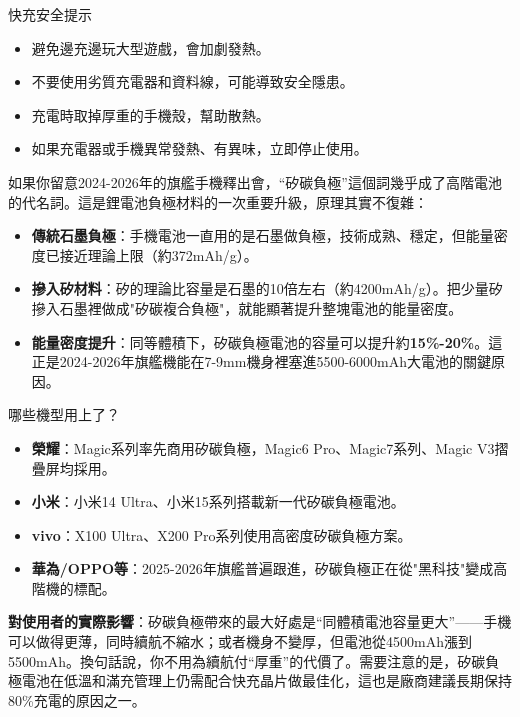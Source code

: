 \begin{tcbwarn}{快充安全提示}
\begin{itemize}
  \item 避免邊充邊玩大型遊戲，會加劇發熱。
  \item 不要使用劣質充電器和資料線，可能導致安全隱患。
  \item 充電時取掉厚重的手機殼，幫助散熱。
  \item 如果充電器或手機異常發熱、有異味，立即停止使用。
\end{itemize}

\end{tcbwarn}


如果你留意2024-2026年的旗艦手機釋出會，“矽碳負極”這個詞幾乎成了高階電池的代名詞。這是鋰電池負極材料的一次重要升級，原理其實不復雜：

\begin{itemize}
  \item \textbf{傳統石墨負極}：手機電池一直用的是石墨做負極，技術成熟、穩定，但能量密度已接近理論上限（約372mAh/g）。
  \item \textbf{摻入矽材料}：矽的理論比容量是石墨的10倍左右（約4200mAh/g）。把少量矽摻入石墨裡做成"矽碳複合負極"，就能顯著提升整塊電池的能量密度。
  \item \textbf{能量密度提升}：同等體積下，矽碳負極電池的容量可以提升約\textbf{15\%-20\%}。這正是2024-2026年旗艦機能在7-9mm機身裡塞進5500-6000mAh大電池的關鍵原因。
\end{itemize}

\begin{tcbinfo}{哪些機型用上了？}
\begin{itemize}
  \item \textbf{榮耀}：Magic系列率先商用矽碳負極，Magic6 Pro、Magic7系列、Magic V3摺疊屏均採用。
  \item \textbf{小米}：小米14 Ultra、小米15系列搭載新一代矽碳負極電池。
  \item \textbf{vivo}：X100 Ultra、X200 Pro系列使用高密度矽碳負極方案。
  \item \textbf{華為/OPPO等}：2025-2026年旗艦普遍跟進，矽碳負極正在從"黑科技"變成高階機的標配。
\end{itemize}

\end{tcbinfo}

\textbf{對使用者的實際影響}：矽碳負極帶來的最大好處是“同體積電池容量更大”——手機可以做得更薄，同時續航不縮水；或者機身不變厚，但電池從4500mAh漲到5500mAh。換句話說，你不用為續航付“厚重”的代價了。需要注意的是，矽碳負極電池在低溫和滿充管理上仍需配合快充晶片做最佳化，這也是廠商建議長期保持80\%充電的原因之一。

